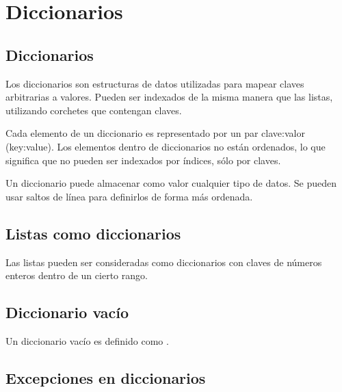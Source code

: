 \chapter{Diccionarios}

\section{Diccionarios}

Los diccionarios son estructuras de datos utilizadas para mapear claves arbitrarias a valores.
Pueden ser indexados de la misma manera que las listas, utilizando corchetes que contengan claves.


Cada elemento de un diccionario es representado por un par clave:valor (key:value).
Los elementos dentro de diccionarios no están ordenados, lo que significa que no pueden ser indexados por índices, sólo por claves.

Un diccionario puede almacenar como valor cualquier tipo de datos.
Se pueden usar saltos de línea para definirlos de forma más ordenada.


\section{Listas como diccionarios}

Las listas pueden ser consideradas como diccionarios con claves de números enteros dentro de un cierto rango.


\section{Diccionario vacío}

Un diccionario vacío es definido como \ttt{\{\}}.


\section{Excepciones en diccionarios}


